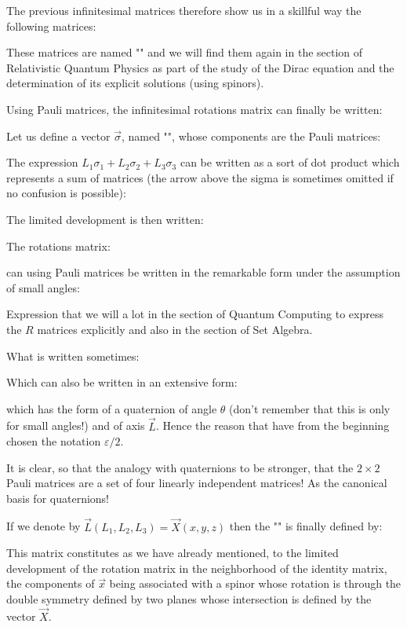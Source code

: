 	The previous infinitesimal matrices therefore show us in a skillful way the following matrices:
	
	These matrices are named "\label{pauli matrices origin}" and we will find them again in the section of Relativistic Quantum Physics as part of the study of the Dirac equation and the determination of its explicit solutions (using spinors).
	
	Using Pauli matrices, the infinitesimal rotations matrix can finally be written:
	
	Let us define a vector $\vec{\sigma}$, named "", whose components are the Pauli matrices:
	
	The expression $L_1\sigma_1+L_2\sigma_2+L_3\sigma_3$ can be written as a sort of dot product which represents a sum of matrices\label{spinor dot product} (the arrow above the sigma is sometimes omitted if no confusion is possible):
	
	The limited development is then written:
	
	The rotations matrix:
	
	can using Pauli matrices be written in the remarkable form under the assumption of small angles:
	
	Expression that we will a lot in the section of Quantum Computing to express the $R$ matrices explicitly and also in the section of Set Algebra.
	
	What is written sometimes:
	
	Which can also be written in an extensive form:
	
	which has the form of a quaternion of angle $\theta$ (don't remember that this is only for small angles!) and of axis $\vec{L}$. Hence the reason that  have from the beginning chosen the notation $\varepsilon/2$.
	
	It is clear, so that the analogy with quaternions to be stronger, that the $2\times 2$ Pauli matrices are a set of four linearly independent matrices! As the canonical basis for quaternions!
	
	If we denote by $\vec{L}(L_1,L_2,L_3)=\vec{X}(x,y,z)$  then the "" is finally defined by:
	
	This matrix constitutes as we have already mentioned, to the limited development of the rotation matrix in the neighborhood of the identity matrix, the components of $\vec{x}$ being associated with a spinor whose rotation is through the double symmetry defined by two planes whose intersection is defined by the vector $\vec{X}$.
	
